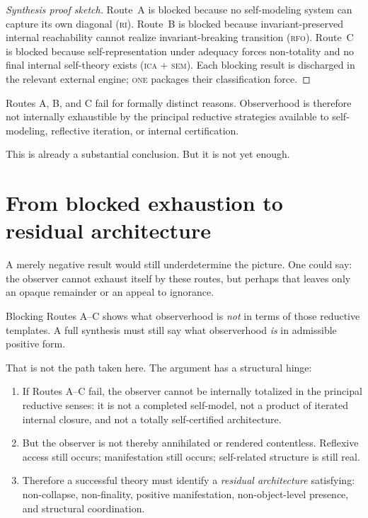 \documentclass[11pt]{article}
\theoremstyle{plain}
\theoremstyle{definition}
\theoremstyle{remark}
\newcommand{\ONE}{\textsc{one}}
\newcommand{\RI}{\textsc{ri}}
\newcommand{\RFO}{\textsc{rfo}}
\newcommand{\ICA}{\textsc{ica}}
\newcommand{\SEM}{\textsc{sem}}
\begin{document}
\begin{proof}[Synthesis proof sketch]
Route~A is blocked because no self-modeling system can capture its own
diagonal (\RI).  Route~B is blocked because invariant-preserved internal
reachability cannot realize invariant-breaking transition (\RFO).
Route~C is blocked because self-representation under adequacy forces
non-totality and no final internal self-theory exists (\ICA{} + \SEM).
Each blocking result is discharged in the relevant external engine; \ONE{}
packages their classification force.
\end{proof}

\begin{keybox}[title={Negative synthesis}]
Routes A, B, and C fail for formally distinct reasons.  Observerhood is
therefore not internally exhaustible by the principal reductive strategies
available to self-modeling, reflective iteration, or internal
certification.
\end{keybox}

This is already a substantial conclusion.  But it is not yet enough.

\section{From blocked exhaustion to residual architecture}
\label{sec:hinge}

A merely negative result would still underdetermine the picture.  One
could say: the observer cannot exhaust itself by these routes, but perhaps
that leaves only an opaque remainder or an appeal to ignorance.

\begin{keybox}[title={Negation alone does not pick out the survivor}]
Blocking Routes A--C shows what observerhood is \emph{not} in terms of
those reductive templates.  A full synthesis must still say what
observerhood \emph{is} in admissible positive form.
\end{keybox}

That is not the path taken here.  The argument has a structural hinge:

\begin{enumerate}[label=(\arabic*),leftmargin=2.2em]
\item If Routes A--C fail, the observer cannot be internally totalized in
      the principal reductive senses: it is not a completed self-model,
      not a product of iterated internal closure, and not a totally
      self-certified architecture.
\item But the observer is not thereby annihilated or rendered contentless.
      Reflexive access still occurs; manifestation still occurs;
      self-related structure is still real.
\item Therefore a successful theory must identify a \emph{residual
      architecture} satisfying: non-collapse, non-finality, positive
      manifestation, non-object-level presence, and structural
      coordination.
\end{enumerate}
\end{document}
